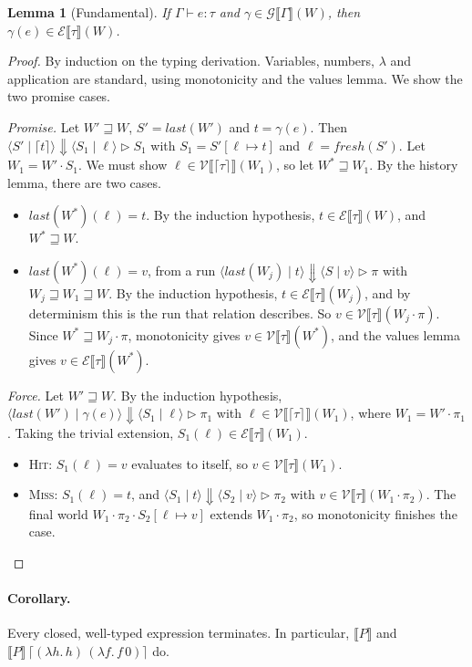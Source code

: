 \documentclass[11pt]{article}
\newtheorem*{lemma}{Lemma}
\newcommand{\Prom}[2]{\lceil #2 \rceil^{#1}}
\newcommand{\prom}[1]{\lceil #1 \rceil}
\newcommand{\slam}[1]{\lambda #1.\,}
\newcommand{\tr}[1]{\llbracket #1 \rrbracket}
\newcommand{\rn}[1]{\textsc{#1}}
\newcommand{\Vrel}[2]{\mathcal{V}\llbracket #1 \rrbracket(#2)}
\newcommand{\Erel}[2]{\mathcal{E}\llbracket #1 \rrbracket(#2)}
\newcommand{\Grel}[2]{\mathcal{G}\llbracket #1 \rrbracket(#2)}
\newcommand{\last}[1]{\mathit{last}(#1)}
\newcommand{\ext}{\sqsupseteq}
\newcommand{\cfg}[2]{\langle #1 \mid #2 \rangle}
\newcommand{\evals}[5]{\cfg{#1}{#2} \Downarrow \cfg{#3}{#4} \mathrel{\triangleright} #5}
\newcommand{\fresh}{\mathit{fresh}}
\begin{document}
\begin{lemma}[Fundamental]
  If $\Gamma \vdash e : \tau$ and $\gamma \in \Grel{\Gamma}{W}$, then
  $\gamma(e) \in \Erel{\tau}{W}$.
\end{lemma}
\begin{proof}
  By induction on the typing derivation. Variables, numbers, $\lambda$ and
  application are standard, using monotonicity and the values lemma. We show
  the two promise cases.

  \emph{Promise.} Let $W' \ext W$, $S' = \last{W'}$ and $t = \gamma(e)$. Then
  $\evals{S'}{\prom{t}}{S_1}{\ell}{S_1}$ with $S_1 = S'[\ell \mapsto t]$ and
  $\ell = \fresh(S')$. Let $W_1 = W' \cdot S_1$. We must show
  $\ell \in \Vrel{\Prom{}{\tau}}{W_1}$, so let $W^* \ext W_1$. By the history
  lemma, there are two cases.
  \begin{itemize}
    \item $\last{W^*}(\ell) = t$. By the induction hypothesis,
      $t \in \Erel{\tau}{W}$, and $W^* \ext W$.
    \item $\last{W^*}(\ell) = v$, from a run
      $\evals{\last{W_j}}{t}{S}{v}{\pi}$ with $W_j \ext W_1 \ext W$. By the
      induction hypothesis, $t \in \Erel{\tau}{W_j}$, and by determinism this
      is the run that relation describes. So
      $v \in \Vrel{\tau}{W_j \cdot \pi}$. Since $W^* \ext W_j \cdot \pi$,
      monotonicity gives $v \in \Vrel{\tau}{W^*}$, and the values lemma gives
      $v \in \Erel{\tau}{W^*}$.
  \end{itemize}

  \emph{Force.} Let $W' \ext W$. By the induction hypothesis,
  $\evals{\last{W'}}{\gamma(e)}{S_1}{\ell}{\pi_1}$ with
  $\ell \in \Vrel{\Prom{}{\tau}}{W_1}$, where $W_1 = W' \cdot \pi_1$. Taking
  the trivial extension, $S_1(\ell) \in \Erel{\tau}{W_1}$.
  \begin{itemize}
    \item \rn{Hit}: $S_1(\ell) = v$ evaluates to itself, so
      $v \in \Vrel{\tau}{W_1}$.
    \item \rn{Miss}: $S_1(\ell) = t$, and
      $\evals{S_1}{t}{S_2}{v}{\pi_2}$ with $v \in \Vrel{\tau}{W_1 \cdot \pi_2}$.
      The final world $W_1 \cdot \pi_2 \cdot S_2[\ell \mapsto v]$ extends
      $W_1 \cdot \pi_2$, so monotonicity finishes the case. \qedhere
  \end{itemize}
\end{proof}

\paragraph{Corollary.}
Every closed, well-typed expression terminates. In particular,
$\tr{P}$ and $\tr{P}\,\prom{(\slam{h} h)\,(\slam{f} f\,0)}$ do.
\end{document}
